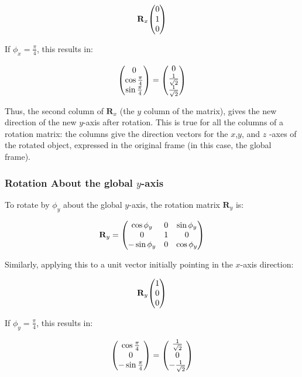 \documentclass{article}
\begin{document}
\begin{equation}
\mathbf{R}_x \mqty( 0 \\ 1 \\ 0 )
\end{equation}

If \( \phi_x = \frac{\pi}{4} \), this results in:

\begin{equation}
\mqty( 0 \\ \cos \frac{\pi}{4} \\ \sin \frac{\pi}{4} ) = \mqty( 0 \\ \frac{1}{\sqrt{2}} \\ \frac{1}{\sqrt{2}} )
\end{equation}


Thus, the second column of  \( \mathbf{R}_x \) (the \( y \) column of the matrix), gives the new direction of the new \(y\)-axis after rotation. This is true for all the columns of a rotation matrix: the columns give the direction vectors for the \(x\),\(y\), and \(z\) -axes of the rotated object, expressed in the original frame (in this case, the global frame).

\subsubsection*{Rotation About the global \( y \)-axis}

To rotate by \( \phi_y \) about the global \( y \)-axis, the rotation matrix \( \mathbf{R}_y \) is:

\begin{equation}
\mathbf{R}_y = \mqty(
\cos \phi_y & 0 & \sin \phi_y \\
0 & 1 & 0 \\
-\sin \phi_y & 0 & \cos \phi_y
)
\label{eq:Ry}
\end{equation}

Similarly, applying this to a unit vector initially pointing in the \( x \)-axis direction:

\begin{equation}
\mathbf{R}_y \mqty( 1 \\ 0 \\ 0 )
\end{equation}

If \( \phi_y = \frac{\pi}{4} \), this results in:

\begin{equation}
\mqty( \cos \frac{\pi}{4} \\ 0 \\ -\sin \frac{\pi}{4} ) = \mqty( \frac{1}{\sqrt{2}} \\ 0 \\ -\frac{1}{\sqrt{2}} )
\end{equation}
\end{document}
